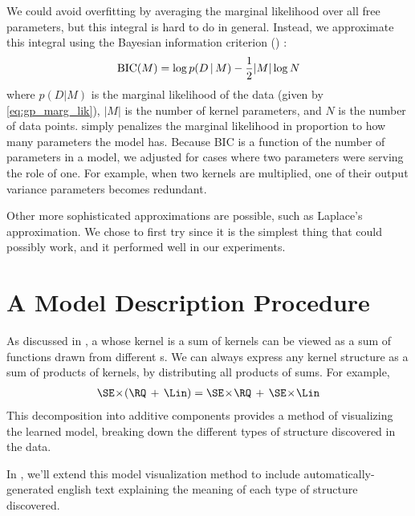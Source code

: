 We could avoid overfitting by averaging the marginal likelihood over all free parameters, but this integral is hard to do in general.
Instead, we approximate this integral using the Bayesian information criterion (\BIC{}) \citep{schwarz1978estimating}:
%
\begin{equation}
\textrm{BIC}(M) = \log p(D \,|\, M) - \frac{1}{2} |M| \log N
\end{equation}
%
where $p(D|M)$ is the marginal likelihood of the data (given by \cref{eq:gp_marg_lik}), $|M|$ is the number of kernel parameters, and $N$ is the number of data points.
\BIC{} simply penalizes the marginal likelihood in proportion to how many parameters the model has.
Because BIC is a function of the number of parameters in a model, we adjusted for cases where two parameters were serving the role of one.  For example, when two kernels are multiplied, one of their output variance parameters becomes redundant.

Other more sophisticated approximations are possible, such as Laplace's approximation.
We chose to first try \BIC{} since it is the simplest thing that could possibly work, and it performed well in our experiments.




\section{A Model Description Procedure}

As discussed in , a \gp{} whose kernel is a sum of kernels can be viewed as a sum of functions drawn from different \gp{}s.
We can always express any kernel structure as a sum of products of kernels, by distributing all products of sums.
For example,
%
\begin{align}
\SE \kerntimes (\RQ \kernplus \Lin) = \SE \kerntimes  \RQ \kernplus \SE \kerntimes \Lin
\end{align}
%
This decomposition into additive components provides a method of visualizing the learned model, breaking down the different types of structure discovered in the data.

In , we'll extend this model visualization method to include automatically-generated english text explaining the meaning of each type of structure discovered.



